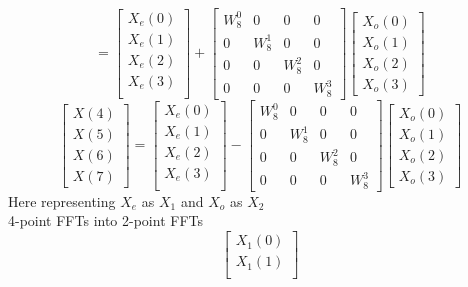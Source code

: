 \documentclass[journal,12pt,twocolumn]{IEEEtran}
\renewcommand\thesection{\arabic{section}}
\begin{document}
\begin{enumerate}[label=\thesection.\arabic*.,ref=\thesection.\theenumi]
\begin{equation}
=
\begin{bmatrix}
X_{e}(0) \\ 
X_{e}(1)\\ 
X_{e}(2)\\
X_{e}(3)\\
\end{bmatrix}
+
\begin{bmatrix}
W^{0}_{8} & 0 & 0 & 0\\
0 & W^{1}_{8} & 0 & 0\\
0 & 0 & W^{2}_{8} & 0\\
0 & 0 & 0 & W^{3}_{8}
\end{bmatrix}
\begin{bmatrix}
X_{o}(0) \\ 
X_{o}(1) \\ 
X_{o}(2) \\
X_{o}(3)
\end{bmatrix}
\end{equation}
\begin{equation}
\begin{bmatrix}
X(4) \\ 
X(5) \\ 
X(6) \\ 
X(7)
\end{bmatrix}
=
\begin{bmatrix}
X_{e}(0) \\ 
X_{e}(1)\\ 
X_{e}(2)\\
X_{e}(3)\\
\end{bmatrix}
-
\begin{bmatrix}
W^{0}_{8} & 0 & 0 & 0\\
0 & W^{1}_{8} & 0 & 0\\
0 & 0 & W^{2}_{8} & 0\\
0 & 0 & 0 & W^{3}_{8}
\end{bmatrix}
\begin{bmatrix}
X_{o}(0) \\ 
X_{o}(1) \\ 
X_{o}(2) \\
X_{o}(3)
\end{bmatrix}
\end{equation}
Here representing $X_{e}$ as $X_{1}$ and $X_{o}$ as $X_{2}$\\
4-point FFTs into 2-point FFTs
\begin{equation}
\begin{bmatrix}
X_{1}(0) \\ 
X_{1}(1)\\ 

\end{bmatrix}
\end{equation}
\end{enumerate}
\end{document}
